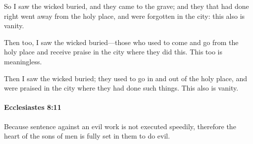 			\begin{versebox}
					\item[BHS] 
					\item[LXX] 
					\item[ASV] So I saw the wicked buried, and they came to the grave; and they that had done right went away from the holy place, and were forgotten in the city: this also is vanity.
					\item[NIV] Then too, I saw the wicked buried—those who used to come and go from the holy place and receive praise in the city where they did this. This too is meaningless.
					\item[NRSV] Then I saw the wicked buried; they used to go in and out of the holy place, and were praised in the city where they had done such things. This also is vanity.
			\end{versebox}

		\paragraph{Ecclesiastes 8:11} %
			\label{ECCLESIASTES-8-11}

			Because sentence against an evil work is not executed speedily, therefore the heart of the sons of men is fully set in them to do evil.

